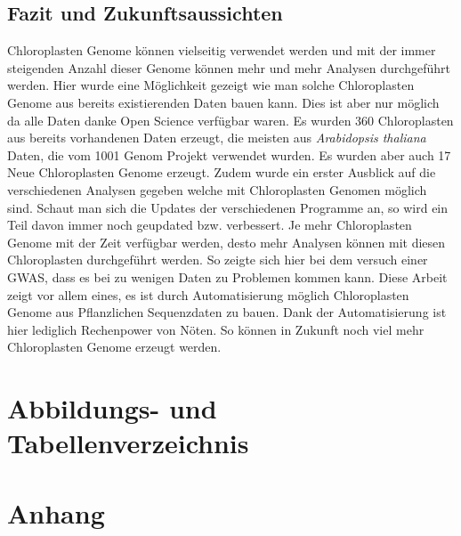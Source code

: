 \documentclass{scrartcl}
\begin{document}
\subsection{Fazit und Zukunftsaussichten}
\label{sec-5-8}
Chloroplasten Genome können vielseitig verwendet werden und mit der immer steigenden Anzahl dieser Genome können mehr und mehr Analysen durchgeführt werden. Hier wurde eine Möglichkeit gezeigt wie man solche Chloroplasten Genome
aus bereits existierenden Daten bauen kann. Dies ist aber nur möglich da alle Daten danke Open Science verfügbar waren. Es wurden 360 Chloroplasten aus bereits vorhandenen Daten erzeugt, die meisten aus \emph{Arabidopsis thaliana}
Daten, die vom 1001 Genom Projekt verwendet wurden. Es wurden aber auch 17 Neue Chloroplasten Genome erzeugt. Zudem wurde ein erster Ausblick auf die verschiedenen Analysen gegeben welche mit Chloroplasten Genomen möglich sind.
Schaut man sich die Updates der verschiedenen Programme an, so wird ein Teil davon immer noch geupdated bzw. verbessert. Je mehr Chloroplasten Genome mit der Zeit verfügbar werden, desto 
mehr Analysen können mit diesen Chloroplasten durchgeführt werden. So zeigte sich hier bei dem versuch einer GWAS, dass es bei zu wenigen Daten zu Problemen kommen kann. 
Diese Arbeit zeigt vor allem eines, es ist durch Automatisierung möglich Chloroplasten Genome aus Pflanzlichen Sequenzdaten zu bauen. Dank der Automatisierung ist hier lediglich Rechenpower von Nöten. So können in Zukunft
noch viel mehr Chloroplasten Genome erzeugt werden.
\section{Abbildungs- und Tabellenverzeichnis}
\label{sec-6}
\listoffigures

\listoftables
\clearpage
\section{Anhang}
\label{sec-7}
\end{document}
